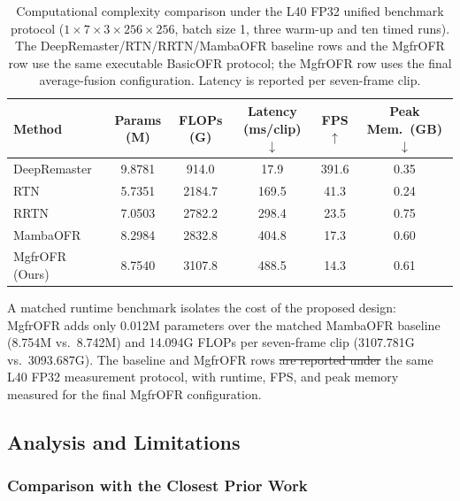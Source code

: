 \documentclass[symmetry,article,submit,pdftex,moreauthors]{Definitions/mdpi}
\providecommand{\DIFadd}[1]{{\protect\color{blue}\uwave{#1}}} %
\providecommand{\DIFdel}[1]{{\protect\color{red}\sout{#1}}}                      %
\providecommand{\DIFaddbegin}{} %
\providecommand{\DIFaddend}{} %
\providecommand{\DIFdelbegin}{} %
\providecommand{\DIFdelend}{} %
\begin{document}
\begin{table}[htbp]
\caption{Computational complexity comparison under the L40 FP32 unified benchmark protocol ($1{\times}7{\times}3{\times}256{\times}256$, batch size 1, three warm-up and ten timed runs). The DeepRemaster/RTN/RRTN/MambaOFR baseline rows and the MgfrOFR row use the same executable BasicOFR protocol; the MgfrOFR row uses the final average-fusion configuration. Latency is reported per seven-frame clip.\label{tab:complexity}}
\begin{tabularx}{\textwidth}{lCCCCC}
\toprule
\textbf{Method} & \textbf{Params (M)} & \textbf{FLOPs (G)} & \textbf{Latency (ms/clip)$\downarrow$} & \textbf{FPS$\uparrow$} & \textbf{Peak Mem.\ (GB)$\downarrow$} \\
\midrule
DeepRemaster~\cite{iizuka2019deepremaster}   & 9.8781 & 914.0  & 17.9  & 391.6 & 0.35 \\
RTN~\cite{wan2022rtn}                        & 5.7351 & 2184.7 & 169.5 & 41.3  & 0.24 \\
RRTN~\cite{lin2024rrtn}                      & 7.0503 & 2782.2 & 298.4 & 23.5  & 0.75 \\
MambaOFR~\cite{mao2025mambaofr}              & 8.2984 & 2832.8 & 404.8 & 17.3  & 0.60 \\
\midrule
MgfrOFR (Ours)                              & 8.7540 & 3107.8 & 488.5 & 14.3  & 0.61 \\
\bottomrule
\end{tabularx}
\end{table}

A matched runtime benchmark isolates the cost of the proposed design: MgfrOFR adds only 0.012M parameters over the matched MambaOFR baseline (8.754M vs.\ 8.742M) and 14.094G FLOPs per seven-frame clip (3107.781G vs.\ 3093.687G). The baseline and MgfrOFR rows \DIFdelbegin \DIFdel{are reported under }\DIFdelend \DIFaddbegin \DIFadd{use }\DIFaddend the same L40 FP32 measurement protocol, with runtime, FPS, and peak memory measured for the final MgfrOFR configuration.

\FloatBarrier
\subsection{Analysis and Limitations}
\label{subsec:analysis_limitations}

\subsubsection{Comparison with the Closest Prior Work}
\label{subsec:vs_mambaofr}
\end{document}
